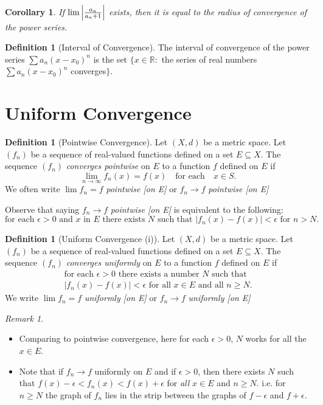 \documentclass[12pt, lettersize]{book}
\theoremstyle{plain}
\newtheorem{cor}{Corollary}[thm]
\theoremstyle{definition}
\newtheorem{dfn}[thm]{Definition}
\theoremstyle{remark}
\newtheorem*{rem}{Remark}
\newcommand{\R}{\mathbb{R}}
\begin{document}
		\begin{cor}
			If $\lim\abs{\frac{a_n}{a_n+1}}$ exists, then it is equal to the radius of convergence of the power series.
		\end{cor}
		
		\begin{dfn}[Interval of Convergence]
			The interval of convergence of the power series $\sum a_n(x-x_0)^n$ is the set $\{x\in\R:$ the series of real numbers $\sum a_n(x-x_0)^n$ converges$\}$.
		\end{dfn}
		\newpage
		\section{Uniform Convergence}
		\begin{dfn}[Pointwise Convergence]
			Let $(X,d)$ be a metric space. Let $(f_n)$ be a sequence of real-valued functions defined on a set $E\subseteq X$. The sequence $(f_n)$ \emph{converges pointwise} on $E$ to a function $f$ defined on $E$ if
			\begin{displaymath}
				\lim\limits_{n\rightarrow\infty}f_n(x)=f(x)\quad\text{for each}\quad x\in S.
			\end{displaymath}
			We often write $\lim f_n=f$ \emph{pointwise [on E]} or $f_n\rightarrow f$ \emph{pointwise [on E]}
		\end{dfn}
		Observe that saying $f_n\rightarrow f$ \emph{pointwise [on E]} is equivalent to the following:
		\begin{displaymath}
			\text{for each $\epsilon>0$ and $x$ in $E$ there exists $N$ such that $|f_n(x)-f(x)|<\epsilon$ for $n>N$.}
		\end{displaymath}
		
		\begin{dfn}[Uniform Convergence (i)]
			Let $(X,d)$ be a metric space. Let $(f_n)$ be a sequence of real-valued functions defined on a set $E\subseteq X$. The sequence $(f_n)$ \emph{converges uniformly} on $E$ to a function $f$ defined on $E$ if
			\begin{align*}
				\text{for each $\epsilon>0$ there exists a number $N$ such that}\\
				\text{$|f_n(x)-f(x)|<\epsilon$ for all $x\in E$ and all $n\geq N$.}
			\end{align*}
			We write $\lim f_n=f$ \emph{uniformly [on E]} or $f_n\rightarrow f$ \emph{uniformly [on E]}
		\end{dfn}
		\begin{rem}
			\begin{itemize}
				\item Comparing to pointwise convergence, here for each $\epsilon>0$, $N$ works for all the $x\in E$.
				\item Note that if $f_n\rightarrow f$ uniformly on $E$ and if $\epsilon>0$, then there exists $N$ such that $f(x)-\epsilon<f_n(x)<f(x)+\epsilon$ for \emph{all} $x\in E$ and $n\geq N$. i.e. for $n\geq N$ the graph of $f_n$ lies in the strip between the graphs of $f-\epsilon$ and $f+\epsilon$.
			\end{itemize}
		\end{rem}
		
\end{document}
